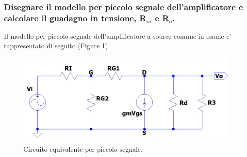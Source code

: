 \documentclass[a4paper,10pt]{article}
\begin{document}
\subsubsection{Disegnare il modello per piccolo segnale dell'amplificatore e calcolare il guadagno in tensione, R$_{in}$ e R$_o$.}
Il modello per piccolo segnale dell'amplificatore a source comune in esame e' rappresentato di seguito (Figure \ref{fig:pic2}). 
\begin{figure}[h!]
 	\includegraphics[width=0.5\linewidth]{es2-2-pc.png}
 	\centering
 	\caption{Circuito equivalente per piccolo segnale.}
  	\label{fig:pic2}
\end{figure}
\end{document}

